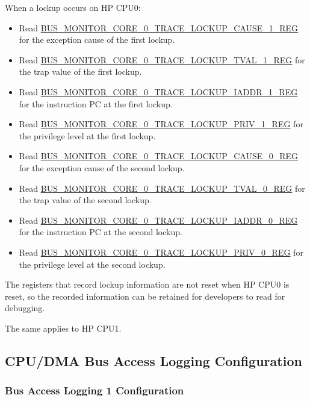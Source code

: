 \documentclass[main\_\_EN.tex]{subfiles}
\begin{document}
When a lockup occurs on HP CPU0:
\begin{itemize}
        \item Read \hyperref[regdesc:BUSMONITORCORE0TRACELOCKUPCAUSE1REG]{BUS\_MONITOR\_CORE\_0\_TRACE\_LOCKUP\_CAUSE\_1\_REG} for the exception cause of the first lockup.
        \item Read \hyperref[regdesc:BUSMONITORCORE0TRACELOCKUPTVAL1REG]{BUS\_MONITOR\_CORE\_0\_TRACE\_LOCKUP\_TVAL\_1\_REG} for the trap value of the first lockup.
        \item Read \hyperref[regdesc:BUSMONITORCORE0TRACELOCKUPIADDR1REG]{BUS\_MONITOR\_CORE\_0\_TRACE\_LOCKUP\_IADDR\_1\_REG} for the instruction PC at the first lockup.
        \item Read \hyperref[regdesc:BUSMONITORCORE0TRACELOCKUPPRIV1REG]{BUS\_MONITOR\_CORE\_0\_TRACE\_LOCKUP\_PRIV\_1\_REG} for the privilege level at the first lockup.

        \item Read \hyperref[regdesc:BUSMONITORCORE0TRACELOCKUPCAUSE0REG]{BUS\_MONITOR\_CORE\_0\_TRACE\_LOCKUP\_CAUSE\_0\_REG} for the exception cause of the second lockup.
        \item Read \hyperref[regdesc:BUSMONITORCORE0TRACELOCKUPTVAL0REG]{BUS\_MONITOR\_CORE\_0\_TRACE\_LOCKUP\_TVAL\_0\_REG} for the trap value of the second lockup.
        \item Read \hyperref[regdesc:BUSMONITORCORE0TRACELOCKUPIADDR0REG]{BUS\_MONITOR\_CORE\_0\_TRACE\_LOCKUP\_IADDR\_0\_REG} for the instruction PC at the second lockup.
        \item Read \hyperref[regdesc:BUSMONITORCORE0TRACELOCKUPPRIV0REG]{BUS\_MONITOR\_CORE\_0\_TRACE\_LOCKUP\_PRIV\_0\_REG} for the privilege level at the second lockup.
\end{itemize}

The registers that record lockup information are not reset when HP CPU0 is reset, so the recorded information can be retained for developers to read for debugging.

The same applies to HP CPU1.

\subsection{CPU/DMA Bus Access Logging Configuration}

\subsubsection{Bus Access Logging 1 Configuration}
\label{sec:hp-cpu-access-mon}
\end{document}
